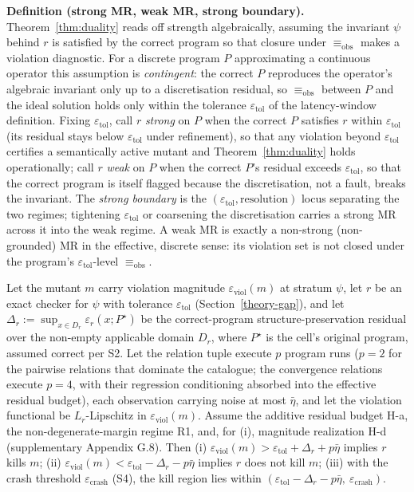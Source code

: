 \documentclass[manuscript,screen,review]{acmart}
\begin{document}
\textbf{Definition (strong MR, weak MR, strong boundary).} Theorem~\ref{thm:duality}
reads off strength algebraically, assuming the invariant $\psi$ behind
$r$ is satisfied by the correct program so that closure under
$\equiv_{\mathrm{obs}}$ makes a violation diagnostic. For a discrete program $P$
approximating a continuous operator this assumption is \emph{contingent}:
the correct $P$ reproduces the operator's algebraic invariant only up to
a discretisation residual, so $\equiv_{\mathrm{obs}}$ between $P$ and the ideal
solution holds only within the tolerance $\varepsilon_{\mathrm{tol}}$ of
the latency-window definition. Fixing $\varepsilon_{\mathrm{tol}}$, call
$r$ \emph{strong} on $P$ when the correct $P$ satisfies $r$ within
$\varepsilon_{\mathrm{tol}}$ (its residual stays below
$\varepsilon_{\mathrm{tol}}$ under refinement), so that any violation
beyond $\varepsilon_{\mathrm{tol}}$ certifies a semantically active
mutant and Theorem~\ref{thm:duality} holds operationally; call $r$ \emph{weak} on $P$
when the correct $P$'s residual exceeds $\varepsilon_{\mathrm{tol}}$, so
that the correct program is itself flagged because the discretisation,
not a fault, breaks the invariant. The \emph{strong boundary} is the
$(\varepsilon_{\mathrm{tol}}, \text{resolution})$ locus separating the
two regimes; tightening $\varepsilon_{\mathrm{tol}}$ or coarsening the
discretisation carries a strong MR across it into the weak regime. A weak
MR is exactly a non-strong (non-grounded) MR in the effective, discrete
sense: its violation set is not closed under the program's
$\varepsilon_{\mathrm{tol}}$-level $\equiv_{\mathrm{obs}}$.

\begin{theorem}\label{thm:window}
Let the mutant $m$ carry violation magnitude
$\varepsilon_{\mathrm{viol}}(m)$ at stratum $\psi$, let $r$ be an exact
checker for $\psi$ with tolerance $\varepsilon_{\mathrm{tol}}$
(Section~\ref{theory-gap}), and let
$\Delta_r := \sup_{x \in D_r} \varepsilon_r(x; P^\star)$ be the
correct-program structure-preservation residual over the non-empty
applicable domain $D_r$, where $P^\star$ is the cell's original program,
assumed correct per S2. Let the relation tuple execute $p$ program runs
($p = 2$ for the pairwise relations that dominate the catalogue; the
convergence relations execute $p = 4$, with their regression
conditioning absorbed into the effective residual budget), each observation carrying noise
at most $\bar\eta$, and let the violation functional be
$L_r$-Lipschitz in $\varepsilon_{\mathrm{viol}}(m)$. Assume the additive
residual budget H-a, the non-degenerate-margin regime R1, and, for (i),
magnitude realization H-d (supplementary Appendix G.8). Then
(i) $\varepsilon_{\mathrm{viol}}(m) > \varepsilon_{\mathrm{tol}} + \Delta_r + p\bar\eta$
implies $r$ kills $m$;
(ii) $\varepsilon_{\mathrm{viol}}(m) < \varepsilon_{\mathrm{tol}} - \Delta_r - p\bar\eta$
implies $r$ does not kill $m$; (iii) with the crash threshold
$\varepsilon_{\mathrm{crash}}$ (S4), the kill region lies within
$(\varepsilon_{\mathrm{tol}} - \Delta_r - p\bar\eta,\ \varepsilon_{\mathrm{crash}})$.
\end{theorem}
\end{document}
